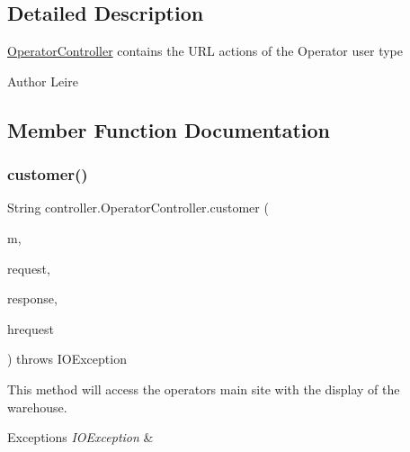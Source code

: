 \subsection{Detailed Description}
\mbox{\hyperlink{classcontroller_1_1_operator_controller}{Operator\+Controller}} contains the U\+RL actions of the Operator user type \begin{DoxyAuthor}{Author}
Leire 
\end{DoxyAuthor}


\subsection{Member Function Documentation}
\mbox{\label{classcontroller_1_1_operator_controller_af4c2983ca84d7115743de160da84135c}} 
\subsubsection{\texorpdfstring{customer()}{customer()}}
{\footnotesize\ttfamily String controller.\+Operator\+Controller.\+customer (\begin{DoxyParamCaption}\item[{Model}]{m,  }\item[{Web\+Request}]{request,  }\item[{Http\+Servlet\+Response}]{response,  }\item[{Http\+Servlet\+Request}]{hrequest }\end{DoxyParamCaption}) throws I\+O\+Exception\hspace{0.3cm}{\ttfamily [inline]}}

This method will access the operator\textquotesingle{}s main site with the display of the warehouse. 
\begin{DoxyExceptions}{Exceptions}
{\em I\+O\+Exception} & \\
\hline
\end{DoxyExceptions}
\mbox{\label{classcontroller_1_1_operator_controller_a1fcb7b5bea154a09eef4db21632bcc60}} 
